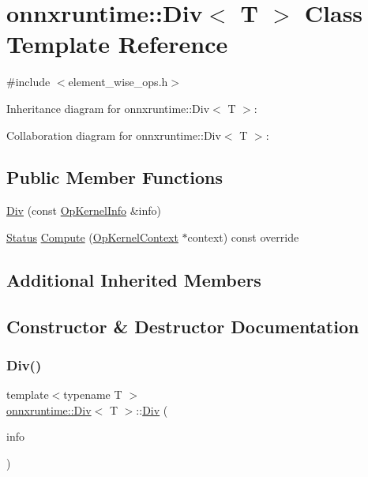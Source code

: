 \hypertarget{classonnxruntime_1_1Div}{}\section{onnxruntime\+:\+:Div$<$ T $>$ Class Template Reference}
\label{classonnxruntime_1_1Div}


{\ttfamily \#include $<$element\+\_\+wise\+\_\+ops.\+h$>$}



Inheritance diagram for onnxruntime\+:\+:Div$<$ T $>$\+:


Collaboration diagram for onnxruntime\+:\+:Div$<$ T $>$\+:
\subsection*{Public Member Functions}
\begin{DoxyCompactItemize}
\item 
\mbox{\hyperlink{classonnxruntime_1_1Div_abb9581319d9df4b95e22fb9d0efeef00}{Div}} (const \mbox{\hyperlink{classonnxruntime_1_1OpKernelInfo}{Op\+Kernel\+Info}} \&info)
\item 
\mbox{\hyperlink{classonnxruntime_1_1common_1_1Status}{Status}} \mbox{\hyperlink{classonnxruntime_1_1Div_aa3b1fcb3e9f72563db651efe31573d0a}{Compute}} (\mbox{\hyperlink{classonnxruntime_1_1OpKernelContext}{Op\+Kernel\+Context}} $\ast$context) const override
\end{DoxyCompactItemize}
\subsection*{Additional Inherited Members}


\subsection{Constructor \& Destructor Documentation}
\mbox{\label{classonnxruntime_1_1Div_abb9581319d9df4b95e22fb9d0efeef00}} 
\subsubsection{\texorpdfstring{Div()}{Div()}}
{\footnotesize\ttfamily template$<$typename T $>$ \\
\mbox{\hyperlink{classonnxruntime_1_1Div}{onnxruntime\+::\+Div}}$<$ T $>$\+::\mbox{\hyperlink{classonnxruntime_1_1Div}{Div}} (\begin{DoxyParamCaption}\item[{const \mbox{\hyperlink{classonnxruntime_1_1OpKernelInfo}{Op\+Kernel\+Info}} \&}]{info }\end{DoxyParamCaption})\hspace{0.3cm}{\ttfamily [inline]}}



